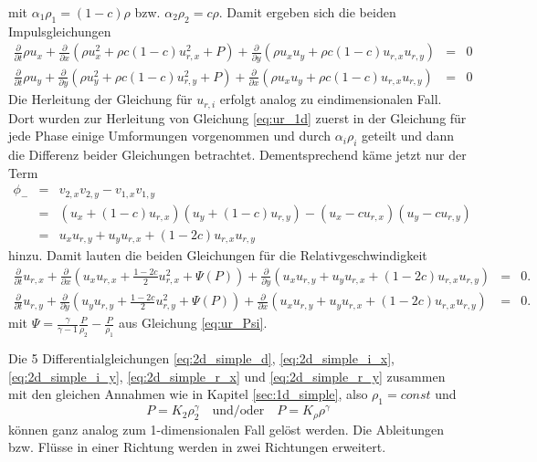 mit $\alpha_1\rho_1 = (1-c)\rho$ bzw. $\alpha_2\rho_2 = c\rho$. Damit
ergeben sich die beiden Impulsgleichungen
%
\begin{eqnarray}
\frac{\partial}{\partial t} \rho u_x + \frac{\partial}{\partial x}
\left( \rho u_x^2 + \rho c (1-c) u_{r,x}^2 + P\right) +
\frac{\partial}{\partial y} \left(\rho u_x u_y + \rho c(1-c) u_{r,x} u_{r,y}\right)
 &=& 0 \label{eq:2d_simple_i_x}\\
%
\frac{\partial}{\partial t} \rho u_y + \frac{\partial}{\partial y} \left(
\rho u_y^2 + \rho c (1-c) u_{r,y}^2 + P\right)
 + \frac{\partial}{\partial x} \left(\rho u_x u_y + \rho c(1-c) u_{r,x} u_{r,y}\right) &=& 0\label{eq:2d_simple_i_y}
\end{eqnarray}
Die Herleitung der Gleichung für $u_{r,i}$ erfolgt analog zu
eindimensionalen Fall. Dort wurden zur Herleitung von Gleichung
\ref{eq:ur_1d} zuerst in der Gleichung für jede Phase einige
Umformungen vorgenommen und durch ${\alpha_i\rho_i}$ geteilt und dann
die Differenz beider Gleichungen betrachtet. Dementsprechend käme
jetzt nur der Term
\begin{eqnarray*}
\phi_- &=& v_{2,x} v_{2,y} - v_{1,x} v_{1,y}\\ 
&=& \left(u_x + (1-c) u_{r,x}\right) \left(u_y + (1-c) u_{r,y}\right)
- \left(u_{x}-c u_{r,x}\right)\left(u_{y}-c u_{r,y}\right)\\
&=&
u_x u_{r,y} + u_y u_{r,x} + (1-2c) u_{r,x} u_{r,y}
\end{eqnarray*}
hinzu. Damit lauten die beiden Gleichungen für die Relativgeschwindigkeit
\begin{eqnarray}
\frac{\partial}{\partial t} u_{r,x} + \frac{\partial}{\partial x}
\left( u_x u_{r,x} + \frac{1-2c}{2} u_{r,x}^2 + \Psi(P)\right) +
\frac{\partial}{\partial y}
\left(u_x u_{r,y} + u_y u_{r,x} + (1-2c)u_{r,x} u_{r,y} \right)
&=& 0.\qquad \label{eq:2d_simple_r_x}\\
%
\frac{\partial}{\partial t} u_{r,y} + \frac{\partial}{\partial y} \left(
u_y u_{r,y} + \frac{1-2c}{2} u_{r,y}^2 + \Psi(P)\right) 
+ \frac{\partial}{\partial x}
\left(u_x u_{r,y} + u_y u_{r,x} + (1-2c)u_{r,x} u_{r,y} \right)
&=& 0.\qquad  \label{eq:2d_simple_r_y}
\end{eqnarray}
mit $\Psi = \frac{\gamma}{\gamma-1} \frac{P}{\rho_2} -
\frac{P}{\rho_1}$ aus Gleichung \ref{eq:ur_Psi}. 

Die 5 Differentialgleichungen \ref{eq:2d_simple_d},
\ref{eq:2d_simple_i_x}, \ref{eq:2d_simple_i_y}, \ref{eq:2d_simple_r_x}
und \ref{eq:2d_simple_r_y} zusammen mit den gleichen Annahmen wie in
Kapitel \ref{sec:1d_simple}, also $\rho_1 = const$ und
\begin{equation}
P = K_2 \rho^\gamma_2\quad\mbox{und/oder}\quad P = K_\rho \rho^\gamma
\end{equation}
können ganz analog zum 1-dimensionalen Fall gelöst werden. Die
Ableitungen bzw. Flüsse in einer Richtung werden in zwei Richtungen
erweitert.


